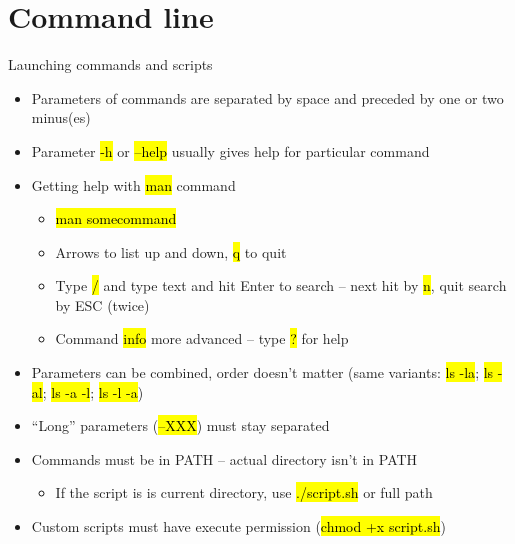 \documentclass[compress, ucs, xelatex, 11pt, xcolor=svgnames,
  hyperref={
    bookmarks=true,
    unicode=true,
    colorlinks=true,
    pdftitle={Linux, command line and MetaCentrum},
    plainpages=false,
    pdfauthor={Vojtech Zeisek},
    pdfsubject={Course about use of Linux command line, writing shell scripts and using MetaCentrum of CESNET},
    pdfcreator={XeLaTeX},
    pdfkeywords={Linux, GNU, BASH, shell, command line, MetaCentrum},
    linkcolor=DarkRed,
    anchorcolor=DarkBlue,
    citecolor=Indigo,
    filecolor=NavyBlue,
    menucolor=DarkMagenta,
    urlcolor=DarkBlue,
    pdftex},
  url={hyphens, lowtilde} %
  ]{beamer}
\renewcommand{\texttt}[1]{\hl{\ttfamily #1}}
\begin{document}
\section{Command line}

\begin{frame}{Launching commands and scripts}
  \begin{itemize}
    \item Parameters of commands are separated by space and preceded by one or two minus(es)
    \item Parameter \texttt{-h} or \texttt{--help} usually gives help for particular command
    \item Getting help with \texttt{man} command
    \begin{itemize}
      \item \texttt{man somecommand}
      \item Arrows to list up and down, \texttt{q} to quit
      \item Type \texttt{/} and type text and hit Enter to search -- next hit by \texttt{n}, quit search by ESC (twice)
      \item Command \texttt{info} more advanced -- type \texttt{?} for help
    \end{itemize}
    \item Parameters can be combined, order doesn't matter (same variants: \texttt{ls -la}; \texttt{ls -al}; \texttt{ls -a -l}; \texttt{ls -l -a})
    \item ``Long'' parameters (\texttt{--XXX}) must stay separated
    \item Commands must be in PATH -- actual directory isn't in PATH
    \begin{itemize}
      \item If the script is is current directory, use \texttt{./script.sh} or full path
    \end{itemize}
    \item Custom scripts must have execute permission (\texttt{chmod +x script.sh})
  \end{itemize}
\end{frame}
\end{document}
